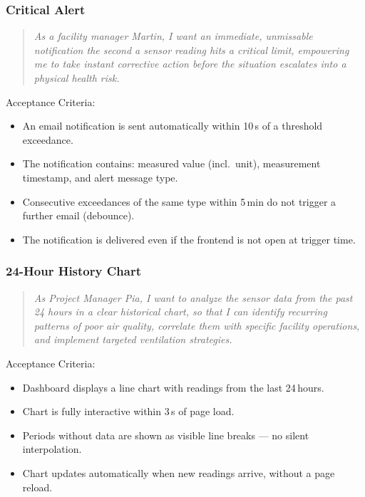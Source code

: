 \documentclass[conference,a4paper,flushend]{cs-techrep} %
\begin{document}
\medskip
\subsubsection{Critical Alert}\label{sec:us_03}

\begin{quote}
    \textit{As a facility manager Martin, I want an immediate, unmissable notification the second a sensor reading hits a 
    critical limit, empowering me to take instant corrective action before the situation escalates into a physical health risk.} 
\end{quote}

Acceptance Criteria:
\begin{itemize}
    \item An email notification is sent automatically within 10\,s of a threshold exceedance.
    \item The notification contains: measured value (incl.\ unit), measurement timestamp, and alert message type.
    \item Consecutive exceedances of the same type within 5\,min do not trigger a further email (debounce).
    \item The notification is delivered even if the frontend is not open at trigger time.
\end{itemize}

\medskip
\subsubsection{24-Hour History Chart}\label{sec:us_04}

\begin{quote}
    \textit{As Project Manager Pia, I want to analyze the sensor data from the past 24 hours in a clear historical chart, 
    so that I can identify recurring patterns of poor air quality, correlate them with specific facility operations, 
    and implement targeted ventilation strategies.}
\end{quote}

Acceptance Criteria:
\begin{itemize}
    \item Dashboard displays a line chart with readings from the last 24\,hours.
    \item Chart is fully interactive within 3\,s of page load.
    \item Periods without data are shown as visible line breaks — no silent interpolation.
    \item Chart updates automatically when new readings arrive, without a page reload.
\end{itemize}
\end{document}
